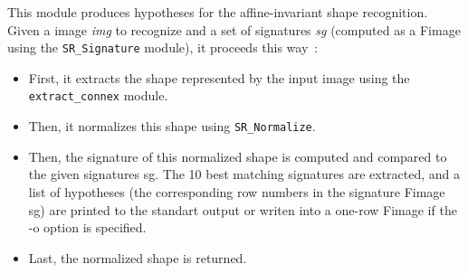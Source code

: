 This module produces hypotheses for the affine-invariant shape recognition. 
Given a image {\it img} to recognize and a set of signatures {\it sg}
(computed as a Fimage
using the \verb+SR_Signature+ module), it proceeds this way~:
\begin{itemize}
\item First, it extracts the shape represented by the input image using the 
\verb+extract_connex+ module.
\item Then, it normalizes this shape using \verb+SR_Normalize+.
\item Then, the signature of this normalized shape is computed and compared to
the given signatures {\sf sg}. The 10 best matching signatures are extracted, 
and a list of hypotheses (the corresponding row numbers in the signature 
Fimage {\sf sg})
are printed to the standart output or writen into a one-row Fimage if the
-o option is specified.
\item Last, the normalized shape is returned.
\end{itemize}
